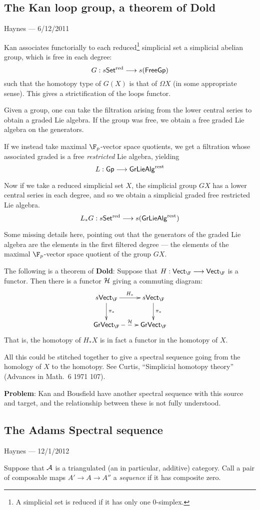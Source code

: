 \documentclass[11pt]{article}
\newcommand{\CONVERSATION}[3]{
\subsection*{#1}
\begin{flushright}
{\small #2 --- #3}
\end{flushright}
}
\begin{document}
\pagebreak
\CONVERSATION{The Kan loop group, a theorem of Dold}{Haynes}{6/12/2011}
Kan associates functorially to each reduced\footnote{A simplicial set is reduced if it has only one 0-simplex.} simplicial set a simplicial abelian group, which is free in each degree:
\[G:s\mathsf{Set^{\textup{red}}}\to s(\mathsf{FreeGp})\]
such that the homotopy type of $G(X)$ is that of $\Omega X$ (in some appropriate sense). This gives a strictification of the loops functor.

Given a group, one can take the filtration arising from the lower central series to obtain a graded Lie algebra. If the group was free, we obtain a free graded Lie algebra on the generators.

If we instead take maximal $\F_p$-vector space quotients, we get a filtration whose associated graded is a free \emph{restricted} Lie algebra, yielding
\[L:\mathsf{Gp}\to\mathsf{GrLieAlg}^{\textup{rest}}\]


Now if we take a reduced simplicial set $X$, the simplicial group $GX$ has a lower central series in each degree, and so we obtain a simplicial graded free restricted Lie algebra.
\[L_*G:s\mathsf{Set^{\textup{red}}}\to s(\mathsf{GrLieAlg}^{\textup{rest}}) \]

Some missing details here, pointing out that the generators of the graded Lie algebra are the elements in the first filtered degree --- the elements of the maximal $\F_p$-vector space quotient of the group $GX$.

The following is a theorem of \textbf{Dold}: Suppose that $H:\mathsf{Vect}_\F\to\mathsf{Vect}_\F$ is a functor. Then there is a functor $\calH$ giving a commuting diagram:
\[\xymatrix{
s\mathsf{Vect}_{\F}\ar[r]^{H_*}\ar[d]^{\pi_*}&
s\mathsf{Vect}_{\F}\ar[d]^{\pi_*}\\
\mathsf{GrVect}_{\F}\ar@{-->}[r]^{\calH}&\mathsf{GrVect}_{\F}
}\]
That is, the homotopy of $H_*X$ is in fact a functor in the homotopy of $X$.

All this could be stitched together to give a spectral sequence going from the homology of $X$ to the homotopy. See Curtis, ``Simplicial homotopy theory'' (Advances in Math.\ 6 1971 107).

\textbf{Problem}: Kan and Bousfield have another spectral sequence with this source and target, and the relationship between these is not fully understood.

\pagebreak
\CONVERSATION{The Adams Spectral sequence}{Haynes}{12/1/2012}
\newcommand{\Pproj}{\calP_{\textup{proj}}}
\newcommand{\Pseq}{\calP_{\textup{seq}}}
Suppose that $\calA$ is a triangulated (an in particular, additive) category. Call a pair of composable maps $A'\to A\to A''$ a \emph{sequence} if it has composite zero.
\end{document}
